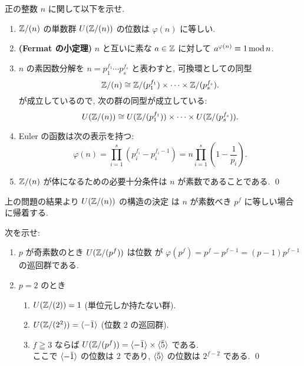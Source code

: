 \documentclass[12pt,twoside]{jarticle}
\begin{document}
\begin{question}[$\Z$ の剰余環の単数群の位数]
 正の整数 $n$ に関して以下を示せ.
 \begin{enumerate}
  \item ${\mathbb Z}/(n)$ の単数群 $U({\mathbb Z}/(n))$ の位数は $\varphi(n)$ に等しい.
  \item {\bf(Fermat の小定理)} %
    $n$ と互いに素な $a\in{\mathbb Z}$ に対して $a^{\varphi(n)}\equiv 1\mathop{\mathrm{mod}}\nolimits n$.
  \item $n$ の素因数分解を $n=p_1^{f_1}\cdots p_s^{f_s}$ と表わすと, 
   可換環としての同型
   \begin{equation*}
    {\mathbb Z}/(n) \cong {\mathbb Z}/(p_1^{f_1})\times\cdots\times{\mathbb Z}/(p_s^{f_s}).
   \end{equation*}
  が成立しているので, 次の群の同型が成立している:
  \begin{equation*}
   U({\mathbb Z}/(n)) \cong U({\mathbb Z}/(p_1^{f_1}))\times\cdots\times U({\mathbb Z}/(p_s^{f_s})).
  \end{equation*}
  \item Euler の函数は次の表示を持つ:
   \begin{equation*}
    \varphi(n) 
    = \prod_{i=1}^s(p_i^{f_i}-p_i^{f_i-1})
    = n\prod_{i=1}^s\left(1-\frac{1}{p_i}\right).
   \end{equation*}
  \item ${\mathbb Z}/(n)$ が体になるための必要十分条件は $n$ が素数であることである.
   \qed
 \end{enumerate}
\end{question}

上の問題の結果より $U({\mathbb Z}/(n))$ の構造の決定
は $n$ が素数べき $p^f$ に等しい場合に帰着する.

\begin{question}[$U(\Z/(p^f))$ の構造の決定, 20点]
 次を示せ:
 \begin{enumerate}
  \item $p$ が奇素数のとき $U(\Z/(p^f))$ は位数
   が $\varphi(p^f)=p^f-p^{f-1}=(p-1)p^{f-1}$ の巡回群である.
  \item $p=2$ のとき
  \begin{enumerate}
   \item $U({\mathbb Z}/(2))=1$ (単位元しか持たない群).
   \item $U({\mathbb Z}/(2^2))=\langle-\bar{1}\rangle$ (位数 $2$ の巡回群).
   \item $f\geqq 3$ ならば $U({\mathbb Z}/(p^f))=\langle-\bar{1}\rangle\times\langle\bar{5}\rangle$
    である. \\
    ここで $\langle-\bar{1}\rangle$ の位数は $2$ であり, 
    $\langle\bar{5}\rangle$ の位数は $2^{f-2}$ である.
    \qed
  \end{enumerate}
 \end{enumerate}
\end{question}
\end{document}
